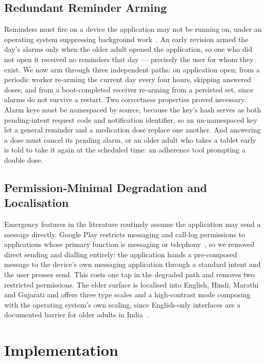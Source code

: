 \documentclass[runningheads,a4paper]{llncs}
\begin{document}
\subsection{Redundant Reminder Arming}
\label{sec:arming}

Reminders must fire on a device the application may not be running on, under an operating
system suppressing background work~\cite{doze}. An early revision armed the day's alarms
only when the older adult opened the application, so one who did not open it received no
reminders that day --- precisely the user for whom they exist. We now arm through three
independent paths: on application open; from a periodic worker re-arming the current day
every four hours, skipping answered doses; and from a boot-completed receiver re-arming
from a persisted set, since alarms do not survive a restart. Two correctness properties
proved necessary. Alarm keys must be namespaced by source, because the key's hash serves as
both pending-intent request code and notification identifier, so an un-namespaced key let a
general reminder and a medication dose replace one another. And answering a dose must
cancel its pending alarm, or an older adult who takes a tablet early is told to take it
again at the scheduled time: an adherence tool prompting a double dose.

\subsection{Permission-Minimal Degradation and Localisation}
\label{sec:perm}

Emergency features in the literature routinely assume the application may send a message
directly. Google Play restricts messaging and call-log permissions to applications whose
primary function is messaging or telephony~\cite{playsms,playblog}, so we removed direct
sending and dialling entirely: the application hands a pre-composed message to the device's
own messaging application through a standard intent and the user presses send. This costs
one tap in the degraded path and removes two restricted permissions. The elder surface is
localised into English, Hindi, Marathi and Gujarati and offers three type scales and a
high-contrast mode composing with the operating system's own scaling, since English-only
interfaces are a documented barrier for older adults in India~\cite{chakraborty,khare}.

\section{Implementation}
\end{document}
